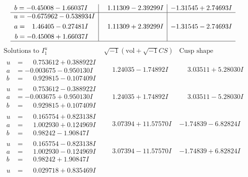 \documentclass[1p]{elsarticle_modified}
\theoremstyle{definition}
\newcommand{\I}{\sqrt{-1}}
\begin{document}
$$\begin{array}{c|c|c}
\begin{aligned}
b &= -0.45008 - 1.66037 I\end{aligned}
 & \phantom{-}1.11309 - 2.39299 I & -1.31545 + 2.74693 I \\ \hline\begin{aligned}
u &= -0.675962 - 0.538934 I \\
a &= \phantom{-}1.46405 - 0.27481 I \\
b &= -0.45008 + 1.66037 I\end{aligned}
 & \phantom{-}1.11309 + 2.39299 I & -1.31545 - 2.74693 I\\
 \hline 
 \end{array}$$\newpage$$\begin{array}{c|c|c}  
\text{Solutions to }I^u_{1}& \I (\text{vol} + \sqrt{-1}CS) & \text{Cusp shape}\\
 \hline 
\begin{aligned}
u &= \phantom{-}0.753612 + 0.388922 I \\
a &= -0.003675 - 0.950130 I \\
b &= \phantom{-}0.929815 - 0.107409 I\end{aligned}
 & \phantom{-}1.24035 - 1.74892 I & \phantom{-}3.03511 + 5.28030 I \\ \hline\begin{aligned}
u &= \phantom{-}0.753612 - 0.388922 I \\
a &= -0.003675 + 0.950130 I \\
b &= \phantom{-}0.929815 + 0.107409 I\end{aligned}
 & \phantom{-}1.24035 + 1.74892 I & \phantom{-}3.03511 - 5.28030 I \\ \hline\begin{aligned}
u &= \phantom{-}0.165754 + 0.823138 I \\
a &= \phantom{-}1.002930 + 0.124969 I \\
b &= \phantom{-}0.98242 - 1.90847 I\end{aligned}
 & \phantom{-}3.07394 + 11.57570 I & -1.74839 - 6.82824 I \\ \hline\begin{aligned}
u &= \phantom{-}0.165754 - 0.823138 I \\
a &= \phantom{-}1.002930 - 0.124969 I \\
b &= \phantom{-}0.98242 + 1.90847 I\end{aligned}
 & \phantom{-}3.07394 - 11.57570 I & -1.74839 + 6.82824 I \\ \hline\begin{aligned}
u &= \phantom{-}0.029718 + 0.835469 I \\

\end{aligned}
\end{array}$$
\end{document}
